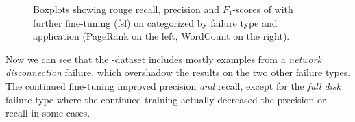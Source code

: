 \begin{figure}[t]
\centering
{}%
\hfill{}%
%
\hfill{}%
\caption[Boxplots showing \acs*{rouge} recall, precision and \(F_1\)-scores
of  with further fine-tuning (\acs*{fsl}) on \hadoop{} categorized by failure type and application.]{Boxplots showing \acs*{rouge} recall, precision and \(F_1\)-scores
of  with further fine-tuning (\acs*{fsl}) on \hadoop{} categorized by failure type and application (PageRank on the left, WordCount on the right).}
\label{fig:bart_cnn_fsl_all_hadoop}
\end{figure}

Now we can see that the \hadoop{}-dataset includes mostly examples from a \emph{network disconnection} failure,
which overshadow the results on the two other failure types.
The continued fine-tuning improved precision \emph{and} recall,
except for the \emph{full disk} failure type where the continued training actually decreased the precision or recall in some cases.


